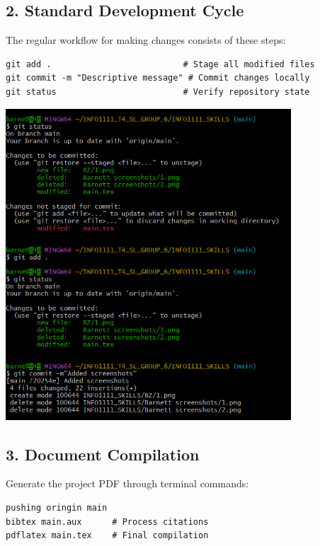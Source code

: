 \documentclass[a4paper, 11pt]{report}
\begin{document}
\subsection*{2. Standard Development Cycle}
The regular workflow for making changes consists of these steps:
\begin{verbatim}
git add .                          # Stage all modified files
git commit -m "Descriptive message" # Commit changes locally
git status                         # Verify repository state
\end{verbatim}

\begin{center}
\includegraphics[width=0.8\textwidth]{BZ/2.png}
\end{center}

\subsection*{3. Document Compilation}
Generate the project PDF through terminal commands:
\begin{verbatim}
pushing oringin main
bibtex main.aux      # Process citations
pdflatex main.tex    # Final compilation
\end{verbatim}
\end{document}
